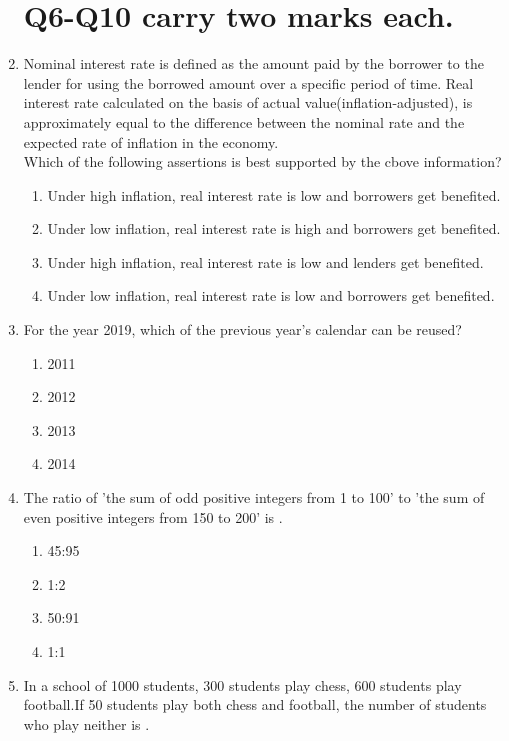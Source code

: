 \documentclass[journal,12pt,onecolumn]{IEEEtran}
\theoremstyle{remark}
\begin{document}
\begin{enumerate}
\section*{Q6-Q10 carry two marks each.}
    \item Nominal interest rate is defined as the amount paid by the borrower to the lender for using the borrowed amount over a specific period of time. Real interest rate calculated on the basis  of actual value(inflation-adjusted), is approximately equal to the difference between the nominal rate and the expected rate of inflation in the economy.\\ Which of the following assertions is best supported by the cbove information?
    \begin{enumerate}
        \item Under high inflation, real interest rate is low and borrowers get benefited.
        \item Under low inflation, real interest rate is high and borrowers get benefited.
        \item Under high inflation, real interest rate is low and lenders get benefited.
        \item Under low inflation, real interest rate is low and borrowers get benefited.
    \end{enumerate}
    \item For the year 2019, which of the previous year's calendar can be reused?
    \begin{enumerate}
        \item 2011
        \item 2012
        \item 2013
        \item 2014
    \end{enumerate}
    \item The ratio of 'the sum of odd positive integers from 1 to 100' to 'the sum of even positive integers from 150 to 200' is {\underline{\hspace{2cm}}}.
    \begin{enumerate}
        \item 45:95
        \item 1:2
        \item 50:91
        \item 1:1
    \end{enumerate}
    \item In a school of 1000 students, 300 students play chess, 600 students play football.If 50 students play both chess and football, the number of students who play neither is {\underline{\hspace{2cm}}}.

\end{enumerate}
\end{document}
